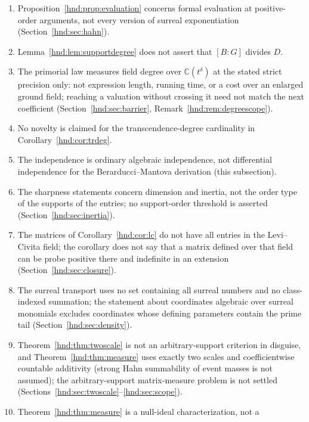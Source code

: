 \documentclass[11pt,oneside]{article}
\theoremstyle{definition}
\theoremstyle{remark}
\newcommand{\C}{\mathbb C}
\newcommand{\No}{\mathbf{No}}
\begin{document}
\begin{enumerate}[label=\arabic*.,leftmargin=2.2em]
closures use the valuation topology of one set-sized workspace, not the fine
topology of $\No$ or $\No[i]$; the surreal corollaries use normal-form
transport, not fine convergence (Section~\ref{hnd:sec:hahn}, this
subsection).
\item Proposition~\ref{hnd:prop:evaluation} concerns formal evaluation at
positive-order arguments, not every version of surreal exponentiation
(Section~\ref{hnd:sec:hahn}).
\item Lemma~\ref{hnd:lem:supportdegree} does not assert that $[B:G]$
divides $D$.
\item The primorial law measures field degree over $\C(t^\delta)$ at the
stated strict precision only: not expression length, running time, or a
cost over an enlarged ground field; reaching a valuation without crossing
it need not match the next coefficient (Section~\ref{hnd:sec:barrier},
Remark~\ref{hnd:rem:degreescope}).
\item No novelty is claimed for the transcendence-degree cardinality in
Corollary~\ref{hnd:cor:trdeg}.
\item The independence is ordinary algebraic independence, not
differential independence for the Berarducci--Mantova derivation (this
subsection).
\item The sharpness statements concern dimension and inertia, not the order
type of the supports of the entries; no support-order threshold is asserted
(Section~\ref{hnd:sec:inertia}).
\item The matrices of Corollary~\ref{hnd:cor:lc} do not have all entries in
the Levi--Civita field; the corollary does not say that a matrix defined
over that field can be probe positive there and indefinite in an extension
(Section~\ref{hnd:sec:closure}).
\item The surreal transport uses no set containing all surreal numbers and
no class-indexed summation; the statement about coordinates algebraic over
surreal monomials excludes coordinates whose defining parameters contain the
prime tail (Section~\ref{hnd:sec:density}).
\item Theorem~\ref{hnd:thm:twoscale} is not an arbitrary-support criterion
in disguise, and Theorem~\ref{hnd:thm:measure} uses exactly two scales and
coefficientwise countable additivity (strong Hahn summability of event
masses is not assumed); the arbitrary-support matrix-measure problem is not
settled (Sections~\ref{hnd:sec:twoscale}--\ref{hnd:sec:scope}).
\item Theorem~\ref{hnd:thm:measure} is a null-ideal characterization, not a

\end{enumerate}
\end{document}

